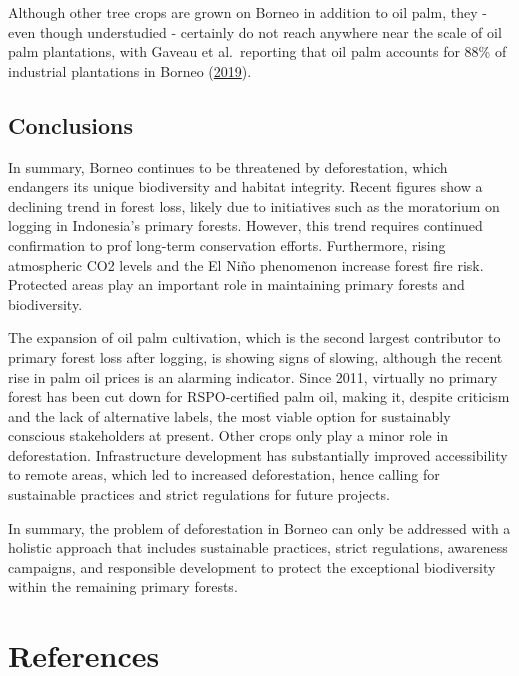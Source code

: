 \documentclass[
  letterpaper,
  DIV=11,
  numbers=noendperiod]{scrreprt}
\begin{document}
Although other tree crops are grown on Borneo in addition to oil palm,
they - even though understudied - certainly do not reach anywhere near
the scale of oil palm plantations, with Gaveau et al.~reporting that oil
palm accounts for 88\% of industrial plantations in Borneo
(\protect\hyperlink{ref-gaveauRiseFallForest2019}{2019}).

\hypertarget{conclusions}{%
\section{Conclusions}\label{conclusions}}

In summary, Borneo continues to be threatened by deforestation, which
endangers its unique biodiversity and habitat integrity. Recent figures
show a declining trend in forest loss, likely due to initiatives such as
the moratorium on logging in Indonesia's primary forests. However, this
trend requires continued confirmation to prof long-term conservation
efforts. Furthermore, rising atmospheric CO2 levels and the El Niño
phenomenon increase forest fire risk. Protected areas play an important
role in maintaining primary forests and biodiversity.

The expansion of oil palm cultivation, which is the second largest
contributor to primary forest loss after logging, is showing signs of
slowing, although the recent rise in palm oil prices is an alarming
indicator. Since 2011, virtually no primary forest has been cut down for
RSPO-certified palm oil, making it, despite criticism and the lack of
alternative labels, the most viable option for sustainably conscious
stakeholders at present. Other crops only play a minor role in
deforestation. Infrastructure development has substantially improved
accessibility to remote areas, which led to increased deforestation,
hence calling for sustainable practices and strict regulations for
future projects.

In summary, the problem of deforestation in Borneo can only be addressed
with a holistic approach that includes sustainable practices, strict
regulations, awareness campaigns, and responsible development to protect
the exceptional biodiversity within the remaining primary forests.


\hypertarget{references}{%
\chapter{References}\label{references}}
\end{document}
